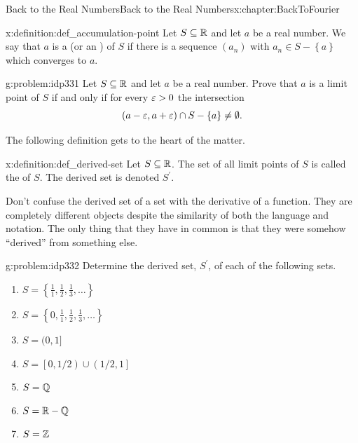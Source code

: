 \begin{chapterptx}{Back to the Real Numbers}{}{Back to the Real Numbers}{}{}{x:chapter:BackToFourier}
\begin{introduction}{}
		\begin{definition}{}{x:definition:def_accumulation-point}%
			 Let \(S\subseteq \mathbb {R}\) and let \(a\) be a real number. We say that \(a\) is a  (or an ) of \(S\) if there is a sequence \((a_n)\) with \(a_n\in S-\left\{a\right\}\) which converges to \(a\).%
		\end{definition}
		\begin{problem}{}{g:problem:idp331}%
			 Let \(S\subseteq\mathbb {R}\) and let \(a\) be a real number. Prove that \(a\) is a limit point of \(S\) if and only if for every \(\varepsilon>0\) the intersection%
			\begin{equation*}
				(a-\varepsilon, a+\varepsilon) \cap S-\left\{a\right\} \neq \emptyset.{}
			\end{equation*}
		\end{problem}
		The following definition gets to the heart of the matter.%
		\begin{definition}{}{x:definition:def_derived-set}%
			 Let \(S\subseteq\mathbb {R}\). The set of all limit points of \(S\) is called the  of \(S\). The derived set is denoted \(S^{\prime}\).%
		\end{definition}
		Don't confuse the derived set of a set with the derivative of a function. They are completely different objects despite the similarity of both the language and notation. The only thing that they have in common is that they were somehow ``derived'' from something else.%
		\begin{problem}{}{g:problem:idp332}%
			Determine the derived set, \(S^\prime\), of each of the following sets.%
			\begin{enumerate}[label=(\alph*)]
				\item{}\(\displaystyle S=\left\{\frac11, \frac12, \frac13, \ldots\right\}\)%
				\item{}\(\displaystyle S=\left\{0,\frac11, \frac12, \frac13, \ldots\right\}\)%
				\item{}\(\displaystyle S=(0,1]\)%
				\item{}\(\displaystyle S=\left[\left.0,1/2\right)\right.\cup\left.\left(1/2,1\right.\right]\)%
				\item{}\(\displaystyle S=\mathbb {Q}\)%
				\item{}\(\displaystyle S=\mathbb {R}-\mathbb {Q}\)%
				\item{}\(\displaystyle S=\mathbb {Z}\)%

\end{enumerate}
\end{problem}
\end{introduction}
\end{chapterptx}
